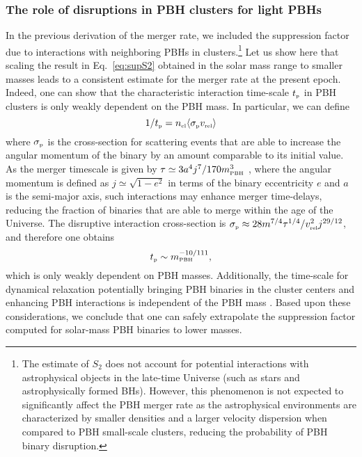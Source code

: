 \documentclass[11pt,a4paper]{article}
\newcommand{\PBH}{\text{\tiny PBH}}
\begin{document}
\subsubsection{The role of disruptions in PBH clusters for light PBHs}
In the previous derivation of the merger rate, we included the suppression factor due to interactions with neighboring PBHs in clusters.\footnote{
The estimate of $S_2$ does not account for potential interactions with  astrophysical objects in the late-time Universe  (such as stars and astrophysically formed BHs). 
However, this phenomenon is not expected to significantly affect the PBH merger rate as the astrophysical environments are characterized by smaller densities and a larger velocity dispersion when compared to PBH small-scale clusters, reducing the probability of PBH binary disruption.} 
Let us show here that scaling the result in Eq.~\eqref{eq:supS2} obtained in the solar mass range to smaller masses leads to a consistent estimate for the merger rate at the present epoch. 
Indeed, one can show that the characteristic interaction time-scale $t_\text{\tiny p}$ in PBH clusters is only weakly dependent on the PBH mass.
In particular, we can define~\cite{Vaskonen:2019jpv}
\begin{equation}
	1/t_\text{\tiny p}  = n_\text{\tiny cl} \langle \sigma_\text{\tiny p} v_\text{\tiny rel}\rangle
\end{equation}
where $\sigma_\text{\tiny p}$ is the cross-section for scattering events that are able to increase the angular momentum of the binary by an amount comparable to its initial value. 
As the merger timescale is given by $\tau \simeq 3 a^4 j^7 / 170 m_\PBH^3$ \cite{Peters:1963ux,Peters:1964zz}, where the angular momentum is defined as $j\simeq \sqrt{1-e^2}$ in terms of the binary eccentricity $e$
and $a$ is the semi-major axis, such interactions may enhance merger time-delays, reducing the fraction of binaries that are able to merge within the age of the Universe.  
The disruptive interaction cross-section is $\sigma_\text{\tiny p} \approx 28 m^{7/4} \tau^{1/4}/v_\text{\tiny rel}^2 j^{29/12}$, and therefore one obtains
\begin{equation}
	t_\text{\tiny p} \sim  m_\PBH^{-10/111},
\end{equation}
which is only weakly dependent on PBH masses.
Additionally, the time-scale for dynamical relaxation potentially bringing PBH binaries in the cluster centers and enhancing PBH interactions is independent of the PBH mass \cite{binn,Vaskonen:2019jpv,DeLuca:2020jug}.
Based upon these considerations, we conclude that one can safely extrapolate the suppression factor computed for solar-mass PBH binaries to lower masses.
\end{document}
